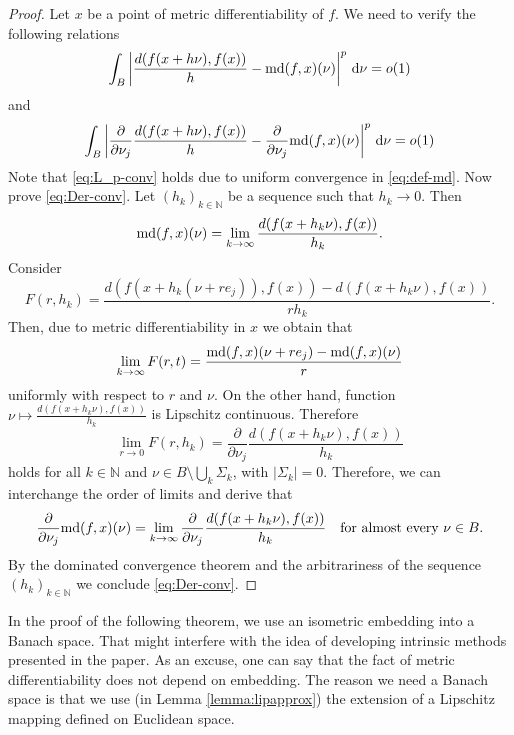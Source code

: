 \documentclass[reqno]{amsart}
\begin{document}
\begin{proof}
Let $x$ be a point of metric differentiability of $f$. We need to verify the following relations
\begin{equation}\label{eq:L_p-conv}
\int_B \bigg|\frac{d(f(x+h\nu), f(x))}{h} - \textnormal{md}(f, x)(\nu)\bigg|^p  \ \textnormal{d}\nu = o(1)
\end{equation}
and
\begin{equation}\label{eq:Der-conv}
\int_B \bigg|\frac{\partial}{\partial \nu_j}\frac{ d(f(x+h\nu), f(x))}{h} - \frac{\partial}{\partial \nu_j}\textnormal{md}(f, x)(\nu)\bigg|^p  \ \textnormal{d}\nu = o(1)
\end{equation}
Note that \eqref{eq:L_p-conv} holds due to uniform convergence in \eqref{eq:def-md}. 
Now prove \eqref{eq:Der-conv}. 
Let  $(h_k)_{k\in\mathbb N}$ be a sequence such that $h_k\to 0$. Then
\[
\textnormal{md}(f, x)(\nu) = \lim_{k\to \infty} \frac{d(f(x+h_k\nu), f(x))}{h_k}.
\]
Consider 
\[
F(r,h_k) = \frac{d(f(x+h_k(\nu+re_j)), f(x)) - d(f(x+h_k\nu), f(x))}{rh_k}.
\]
Then, due to metric differentiability in $x$ we obtain that
\[
\lim_{k\to \infty} F(r,t) = \frac{\textnormal{md}(f, x)(\nu + re_j) - \textnormal{md}(f, x)(\nu)}{r}
\]
uniformly with respect to $r$ and $\nu$. 
On the other hand, function $\nu\mapsto \frac{d(f(x+h_k\nu), f(x))}{h_k}$ is Lipschitz continuous.
Therefore 
\[
\lim_{r\to 0} F(r,h_k) = \frac{\partial}{\partial \nu_j}\frac{d(f(x+h_k\nu), f(x))}{h_k}
\]
holds for all $k\in\mathbb N$ and $\nu\in B\setminus\bigcup_{k}\Sigma_k$, with $|\Sigma_k| = 0$.
Therefore, we can interchange the order of limits and derive that
\[
\frac{\partial}{\partial \nu_j}\textnormal{md}(f, x)(\nu) = \lim_{k\to\infty} \frac{\partial}{\partial \nu_j}\frac{d(f(x+h_k\nu), f(x))}{h_k}
\quad \textnormal{for almost every } \nu \in B.
\]
By the dominated convergence theorem and the arbitrariness of the sequence $(h_k)_{k\in\mathbb N}$ 
we conclude \eqref{eq:Der-conv}.
\end{proof}

In the proof of the following theorem, we use an isometric embedding into a Banach space. That might interfere with the idea of developing intrinsic methods presented in the paper. As an excuse, one can say that the fact of metric differentiability does not depend on embedding. The reason we need a Banach space is that we use (in Lemma \ref{lemma:lipapprox}) 
the extension of a Lipschitz mapping defined on Euclidean space. 
\end{document}
